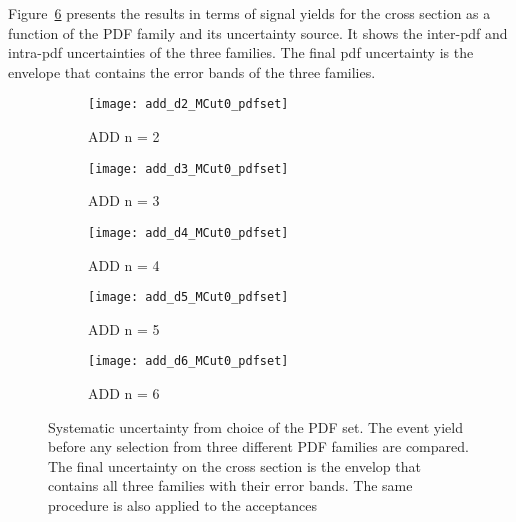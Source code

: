 Figure~\ref{fig:pdf_syst} presents the results in terms of signal yields for the
cross section as a function of the PDF family and its uncertainty source. It
shows the inter-\gls{pdf} and intra-\gls{pdf} uncertainties of the three
families. The final \gls{pdf} uncertainty is the envelope that contains the
error bands of the three families.
\begin{figure}[!h]
  \centering
  \begin{subfigure}{.48\linewidth}
    \texttt{[image: add\_d2\_MCut0\_pdfset]}
    \caption{ADD n = 2}
    \label{fig:pdf_n2}
  \end{subfigure}
  \begin{subfigure}{.48\linewidth}
    \texttt{[image: add\_d3\_MCut0\_pdfset]}
    \caption{ADD n = 3}
    \label{fig:pdf_n3}
  \end{subfigure}
  \begin{subfigure}{.48\linewidth}
    \texttt{[image: add\_d4\_MCut0\_pdfset]}
    \caption{ADD n = 4}
    \label{fig:pdf_n4}
  \end{subfigure}
  \begin{subfigure}{.48\linewidth}
    \texttt{[image: add\_d5\_MCut0\_pdfset]}
    \caption{ADD n = 5}
    \label{fig:pdf_n5}
  \end{subfigure}
  \begin{subfigure}{.48\linewidth}
    \texttt{[image: add\_d6\_MCut0\_pdfset]}
    \caption{ADD n = 6}
    \label{fig:pdf_n6}
  \end{subfigure}
  \caption{Systematic uncertainty from choice of the PDF set. The event yield
    before any selection from three different PDF families are compared. The
    final uncertainty on the cross section is the envelop that contains all
    three families with their error bands. The same procedure is also applied to
    the acceptances}
  \label{fig:pdf_syst}
\end{figure}

